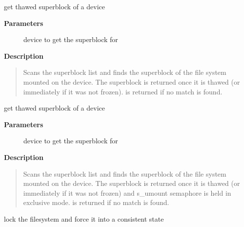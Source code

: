 \documentclass[a4paper,8pt,english]{sphinxmanual}
\begin{document}
\begin{fulllineitems}
\label{filesystems/index:c.get_super_thawed}
get thawed superblock of a device

\end{fulllineitems}


\textbf{Parameters}
\begin{description}
\item[{}] \leavevmode
device to get the superblock for

\end{description}

\textbf{Description}
\begin{quote}

Scans the superblock list and finds the superblock of the file system
mounted on the device. The superblock is returned once it is thawed
(or immediately if it was not frozen).  is returned if no match
is found.
\end{quote}

\begin{fulllineitems}
\label{filesystems/index:c.get_super_exclusive_thawed}
get thawed superblock of a device

\end{fulllineitems}


\textbf{Parameters}
\begin{description}
\item[{}] \leavevmode
device to get the superblock for

\end{description}

\textbf{Description}
\begin{quote}

Scans the superblock list and finds the superblock of the file system
mounted on the device. The superblock is returned once it is thawed
(or immediately if it was not frozen) and s\_umount semaphore is held
in exclusive mode.  is returned if no match is found.
\end{quote}

\begin{fulllineitems}
\label{filesystems/index:c.freeze_super}
lock the filesystem and force it into a consistent state

\end{fulllineitems}
\end{document}
